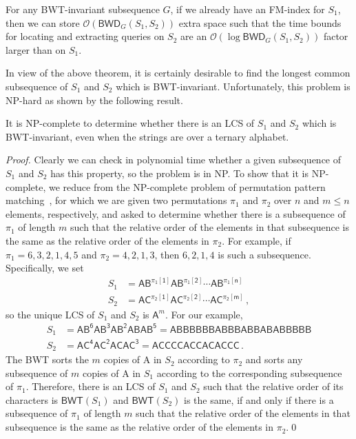\documentclass{llncs}
\newcommand{\Oh}[1]
  {\ensuremath{\mathcal{O}\!\left( {#1} \right)}}
\newcommand{\BWD}
  {\ensuremath{\mathsf{BWD}}}
\newcommand{\BWT}
  {\ensuremath{\mathsf{BWT}}}
\begin{document}
\begin{theorem} \label{theo:locating}
For any BWT-invariant subsequence $G$, if we already have an FM-index for
$S_1$, then we can store $\Oh{\BWD_G (S_1, S_2)}$ extra space such that the
time bounds for locating and extracting queries on $S_2$ are an $\Oh{\log
\BWD_G (S_1, S_2)}$ factor larger than on $S_1$.
\end{theorem}


In view of the above theorem, it is certainly desirable to find the longest
common subsequence of $S_1$ and $S_2$ which is BWT-invariant. Unfortunately,
this problem is NP-hard as shown by the following result.


\begin{theorem}\label{theo:np}
It is NP-complete to determine whether there is an LCS of $S_1$ and $S_2$
which is BWT-invariant, even when the strings are over a ternary alphabet.
\end{theorem}


\begin{proof}
Clearly we can check in polynomial time whether a given subsequence of $S_1$
and $S_2$ has this property, so the problem is in NP.  To show that it is
NP-complete, we reduce from the NP-complete problem of permutation pattern
matching~\cite{BBL98}, for which we are given two permutations $\pi_1$ and
$\pi_2$ over $n$ and \(m \leq n\) elements, respectively, and asked to
determine whether there is a subsequence of $\pi_1$ of length $m$ such that
the relative order of the elements in that subsequence is the same as the
relative order of the elements in $\pi_2$.  For example, if \(\pi_1 = 6, 3,
2, 1, 4, 5\) and \(\pi_2 = 4, 2, 1, 3\), then \(6, 2, 1, 4\) is such a
subsequence. Specifically, we set
\begin{align*}
S_1 & = \mathsf{A B^{\pi_1 [1]} A B^{\pi_1 [2]} \cdots A B^{\pi_1 [n]}}\\
S_2 & = \mathsf{A C^{\pi_2 [1]} A C^{\pi_2 [2]} \cdots A C^{\pi_2 [m]}}\,,
\end{align*}
so the unique LCS of $S_1$ and $S_2$ is $\mathsf{A}^m$.  For our example,
\begin{align*}
S_1 & = \mathsf{A B^6 A B^3 A B^2 A B A B^5} = \mathsf{A B B B B B B A B B B A B B A B A B B B B B}\\
S_2 & = \mathsf{A C^4 A C^2 A C A C^3} = \mathsf{A C C C C A C C A C A C C C}\,.
\end{align*}
The BWT sorts the $m$ copies of {\sf A} in $S_2$ according to $\pi_2$ and
sorts any subsequence of $m$ copies of {\sf A} in $S_1$ according to the
corresponding subsequence of $\pi_1$.  Therefore, there is an LCS of $S_1$
and $S_2$ such that the relative order of its characters is \(\BWT (S_1)\)
and \(\BWT (S_2)\) is the same, if and only if there is a subsequence of
$\pi_1$ of length $m$ such that the relative order of the elements in that
subsequence is the same as the relative order of the elements in $\pi_2$.\qed
\end{proof}
\end{document}
